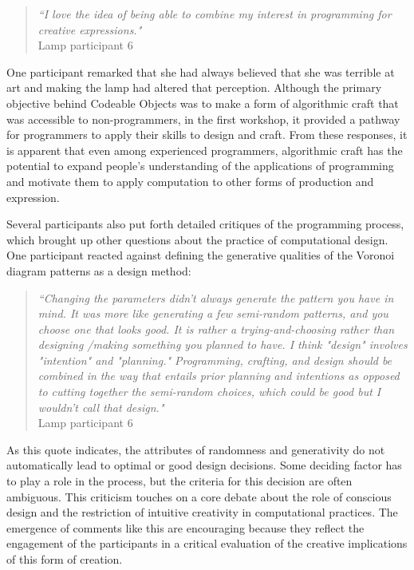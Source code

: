 \begin{quotation}
\textit{``I love the idea of being able to combine my interest in programming for creative expressions."}
\\Lamp participant 6
\end{quotation}

One participant remarked that she had always believed that she was terrible at art and making the lamp had altered that perception. Although the primary objective behind Codeable Objects was to make a form of algorithmic craft that was accessible to non-programmers, in the first workshop, it provided a pathway for programmers to apply their skills to design and craft. From these responses, it is apparent that even among experienced programmers, algorithmic craft has the potential to expand people's understanding of the applications of programming and motivate them to apply computation to other forms of production and expression.

Several participants also put forth detailed critiques of the programming process, which brought up other questions about the practice of computational design. One participant reacted against defining the generative qualities of the Voronoi diagram patterns as a design method:
\begin{quotation}
 \textit{``Changing the parameters didn't always generate the pattern you have in mind. It was more like generating a few semi-random patterns, and you choose one that looks good. It is rather a trying-and-choosing rather than designing /making something you planned to have. I think "design" involves "intention" and "planning." Programming, crafting, and design should be combined in the way that entails prior planning and intentions as opposed to cutting together the semi-random choices, which could be good but I wouldn't call that design."}
 \\Lamp participant 6
 \end{quotation}
 
As this quote indicates, the attributes of randomness and generativity do not automatically lead to optimal or good design decisions. Some deciding factor has to play a role in the process, but the criteria for this decision are often ambiguous. This criticism touches on a core debate about the role of conscious design and the restriction of intuitive creativity in computational practices. The emergence of comments like this are encouraging because they reflect the engagement of the participants in a critical evaluation of the creative implications of this form of creation. 

